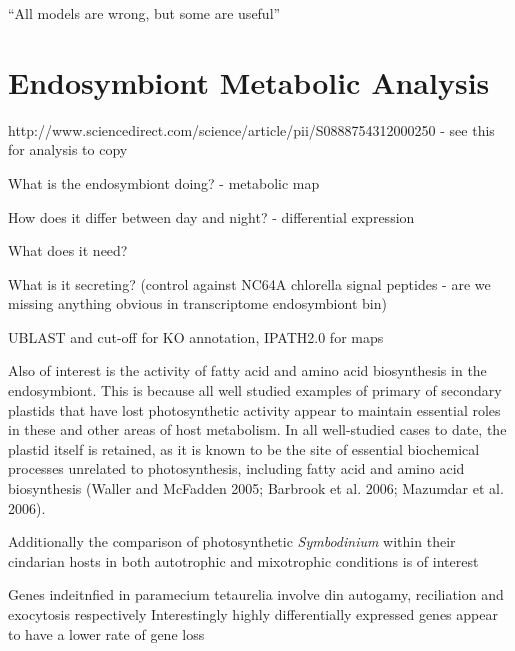 \graphicspath{{chapters/6.Chapter_4/figures}}
 
\begin{savequote}[75mm]
``All models are wrong, but some are useful''
\end{savequote}



\chapter{Endosymbiont Metabolic Analysis}


http://www.sciencedirect.com/science/article/pii/S0888754312000250 - see this for analysis to copy \citep{Xie2012}

What is the endosymbiont doing? - metabolic map

How does it differ between day and night? - differential expression

What does it need?

What is it secreting? (control against NC64A chlorella signal peptides - are we missing anything obvious in transcriptome endosymbiont bin)






UBLAST and cut-off for KO annotation, IPATH2.0 for maps  \citep{Wisecaver2014}




Also of interest is the activity of fatty acid and amino acid biosynthesis in the endosymbiont.  This is because
all well studied examples of primary of secondary plastids that have lost photosynthetic activity appear to maintain 
essential roles in these and other areas of host metabolism.
In all well-studied cases to date, the plastid itself is retained, as it is known to be the site of essential biochemical processes unrelated to photosynthesis, including fatty acid and amino acid biosynthesis (Waller and McFadden 2005; Barbrook et al. 2006; Mazumdar et al. 2006). \citep{Donaher2009}



Additionally the comparison of photosynthetic \textit{Symbodinium} within their cindarian hosts in both autotrophic and mixotrophic conditions
is of interest \citep{Xiang2015}


Genes indeitnfied in paramecium tetaurelia involve din autogamy, reciliation and exocytosis respectively \citep{Arnaiz2010}
Interestingly highly differentially expressed genes appear to have a lower rate of gene loss \citep{Arnaiz2010}




